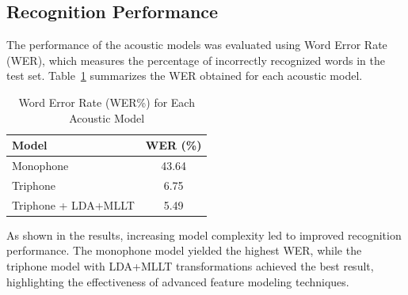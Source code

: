 \subsection{Recognition Performance}

The performance of the acoustic models was evaluated using Word Error Rate (WER), which measures the percentage of incorrectly recognized words in the test set. Table~\ref{tab:wer-results} summarizes the WER obtained for each acoustic model.

\begin{table}[H]
    \centering
    \renewcommand{\arraystretch}{1.3}
    \setlength{\tabcolsep}{16pt}
    \caption{Word Error Rate (WER\%) for Each Acoustic Model}
    \label{tab:wer-results}
    \begin{tabular}{|l|c|}
        \hline
        \textbf{Model} & \textbf{WER (\%)} \\
        \hline
        Monophone & 43.64 \\
        Triphone & 6.75 \\
        Triphone + LDA+MLLT & 5.49 \\
        \hline
    \end{tabular}
\end{table}

As shown in the results, increasing model complexity led to improved recognition performance. The monophone model yielded the highest WER, while the triphone model with LDA+MLLT transformations achieved the best result, highlighting the effectiveness of advanced feature modeling techniques.

